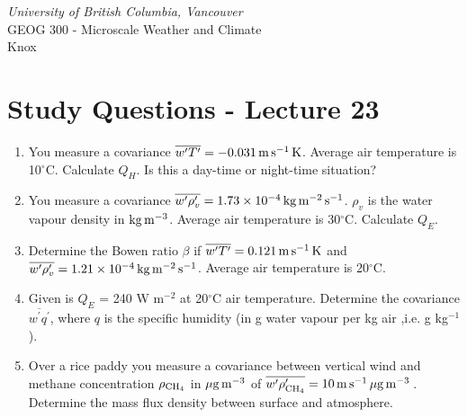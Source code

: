 \documentclass[11pt]{article}
\author{Andy Black and Andreas Christen}
\begin{document}
\begin{center}
\emph{University of British Columbia, Vancouver}\\
GEOG 300 - Microscale Weather and Climate\\
Knox
\section*{Study Questions - Lecture 23}
\end{center}

\begin{enumerate}

\item You measure a covariance $\overline{w^{\prime}T^{\prime}} = -0.031\,\rm{m}\,\rm{s}^{-1}\,\rm{K}$. Average air temperature is 10$^{\circ}$C. Calculate $Q_H$. Is this a day-time or night-time situation?

\item You measure a covariance $\overline{w^{\prime}\rho_v^{\prime}} = 1.73 \times 10^{-4}\, \rm{kg}\,\rm{m}^{-2}\,\rm{s}^{-1}$. $\rho_v$ is the water vapour density in $\rm{kg}\,\rm{m}^{-3}$. Average air temperature is 30$^{\circ}$C. Calculate $Q_E$.

\item Determine the Bowen ratio $\beta$ if $\overline{w^{\prime}T^{\prime}} = 0.121\,\rm{m}\,\rm{s}^{-1}\,\rm{K}$ and $\overline{w^{\prime}\rho_v^{\prime}} = 1.21 \times 10^{-4}\, \rm{kg}\,\rm{m}^{-2}\,\rm{s}^{-1}$. Average air temperature is 20$^{\circ}$C.

\item Given is $Q_E$ = 240 W m$^{-2}$ at 20$^{\circ}$C air temperature. Determine the covariance $\overline{w^{\prime}q^{\prime}}$, where $q$ is the specific humidity (in g water vapour per kg air ,i.e. g kg$^{-1}$).

\item Over a rice paddy you measure a covariance between vertical wind and methane concentration $\rho_{\rm{CH}_4}$ in $\rm{\mu g}\,\rm{m}^{-3}$ of  $\overline{w^{\prime}\rho_{\rm{CH}_4}^{\prime}} = 10 \,\rm{m}\,\rm{s}^{-1}\,\rm{\mu g}\,\rm{m}^{-3}\,$. Determine the mass flux density between surface and atmosphere.

\end{enumerate}

\noindent
\end{document}
